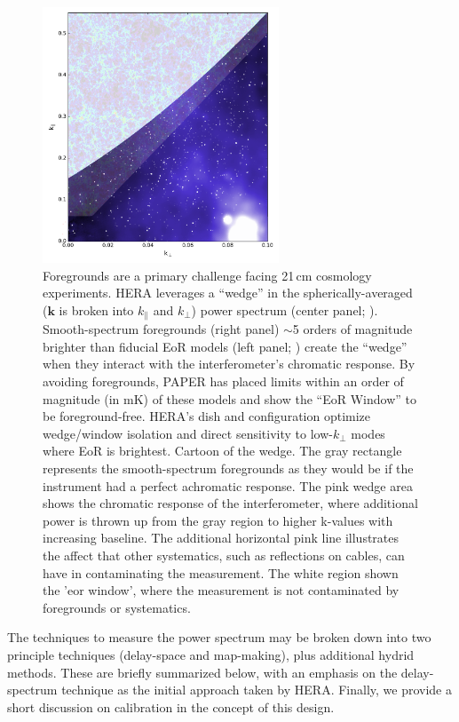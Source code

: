 \documentclass[preprint,11pt]{aastex}
\begin{document}
\begin{figure}[t]
\includegraphics[height=3in]{plots/wedgeWithBG.png}
\caption{Foregrounds are a primary challenge facing 21\,cm cosmology experiments. 
HERA leverages a ``wedge'' in the spherically-averaged ($\mathbf{k}$ is broken into $k_\|$ and $k_\perp$) power spectrum (center panel; \citealt{dillon_et_al2015}). Smooth-spectrum foregrounds (right panel) $\sim$5 orders of magnitude brighter than fiducial EoR models (left panel; \citealt{mesinger_et_al2011}) create the ``wedge'' when they interact with the interferometer's chromatic response. By avoiding foregrounds, PAPER has placed limits within an order
of magnitude (in mK) of these models \citep{ali_et_al2015} and show the ``EoR Window'' to be foreground-free.
HERA's dish and configuration optimize wedge/window isolation and direct sensitivity to low-$k_\perp$ modes where EoR is brightest.
Cartoon of the wedge.  The gray rectangle represents the smooth-spectrum foregrounds as they would be if the instrument had a perfect achromatic response.  The pink wedge area shows the chromatic response of the interferometer, where additional power is thrown up from the gray region to higher k-values with increasing baseline.  The additional horizontal pink line illustrates the affect that other systematics, such as reflections on cables, can have in contaminating the measurement.  The white region shown the 'eor window', where the measurement is not contaminated by foregrounds or systematics.}
\label{fig:wedge}
\end{figure}

The techniques to measure the power spectrum may be broken down into two principle techniques (delay-space and map-making), plus additional hydrid methods.  These are briefly summarized below, with an emphasis on the delay-spectrum technique as the initial approach taken by HERA.  Finally, we provide a short discussion on calibration in the concept of this design.
\end{document}

